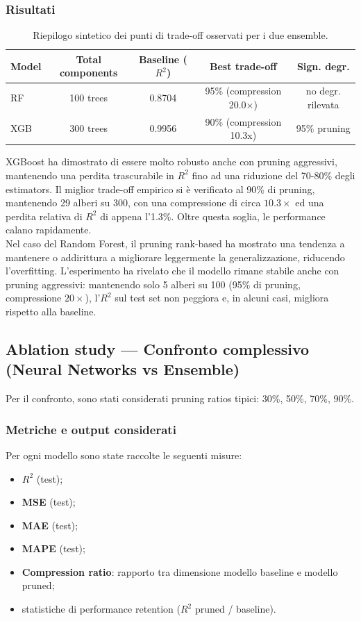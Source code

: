 \documentclass[a4paper,12pt]{report}
\begin{document}
	\subsubsection{Risultati}
	\begin{table}[H]
		\centering
		\setlength{\tabcolsep}{4pt}
		\begin{tabular}{lcccc}
			\toprule
			\textbf{Model} & \textbf{Total components} & \textbf{Baseline (\(R^2\))} & \textbf{Best trade-off} & \textbf{Sign. degr.} \\
			\midrule
			RF        & 100 trees & 0.8704 & 95\% (compression 20.0×) & no degr. rilevata \\
			XGB       & 300 trees & 0.9956 & 90\% (compression 10.3x) & 95\% pruning \\
			\bottomrule
		\end{tabular}
		\caption{Riepilogo sintetico dei punti di trade-off osservati per i due ensemble.}
	\end{table}
	
	XGBoost ha dimostrato di essere molto robusto anche con pruning aggressivi, mantenendo una perdita trascurabile in \(R^2\) fino ad una riduzione del 70-80\% degli estimators. Il miglior trade-off empirico si è verificato al 90\% di pruning, mantenendo 29 alberi su 300, con una compressione di circa $10.3\times$ ed una perdita relativa di \(R^2\) di appena l'1.3\%. Oltre questa soglia, le performance calano rapidamente. \\
	Nel caso del Random Forest, il pruning rank-based ha mostrato una tendenza a mantenere o addirittura a migliorare leggermente la generalizzazione, riducendo l'overfitting. L'esperimento ha rivelato che il modello rimane stabile anche con pruning aggressivi: mantenendo solo 5 alberi su 100 (95\% di pruning, compressione $20\times$), l'\(R^2\) sul test set non peggiora e, in alcuni casi, migliora rispetto alla baseline.
	
	\subsection{Ablation study — Confronto complessivo (Neural Networks vs Ensemble)}
	Per il confronto, sono stati considerati pruning ratios tipici: 30\%, 50\%, 70\%, 90\%.  
	
	\subsubsection{Metriche e output considerati}
	Per ogni modello sono state raccolte le seguenti misure:
	\begin{itemize}
		\item \textbf{\(R^2\)} (test);
		\item \textbf{MSE} (test);
		\item \textbf{MAE} (test);
		\item \textbf{MAPE} (test);
		\item \textbf{Compression ratio}: rapporto tra dimensione modello baseline e modello pruned;
		\item statistiche di performance retention (\(R^2\) pruned / baseline).
	\end{itemize}
	
\end{document}
